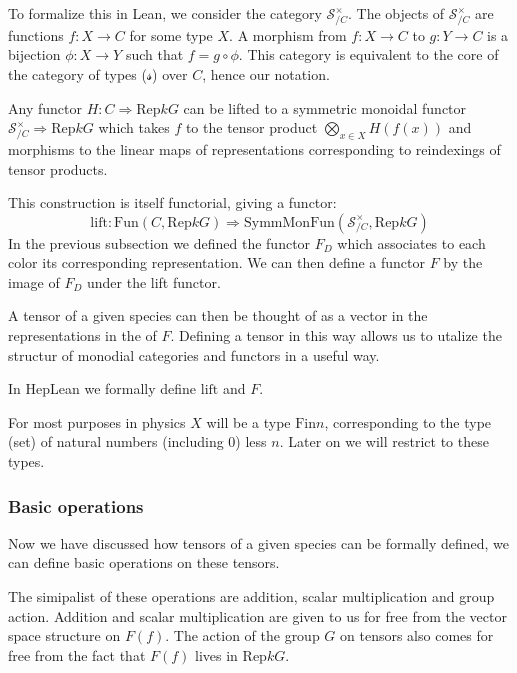 \documentclass[a4paper, 11pt]{article}
\begin{document}
To formalize this in Lean, we consider the category  $\mathcal{S}_{/C}^\times$. The objects 
of $\mathcal{S}_{/C}^\times$ are functions $f : X \to C$  for some type $X$. 
A morphism from $f : X \to C$ to $g : Y \to C$ is a bijection $\phi : X \to Y$ such that 
$f = g \circ \phi$. 
This category is equivalent to the core of the category of types ($\mathcal{s}$) over $C$, hence 
our notation. 

Any functor $H : C \Rightarrow \mathrm{Rep} k G$ can be lifted to a symmetric monoidal 
functor $\mathcal{S}_{/C}^\times \Rightarrow \mathrm{Rep} k G$ which takes $f$ to the 
tensor product $\bigotimes_{x \in X} H(f(x))$ and morphisms to the linear maps 
of representations corresponding to reindexings of
tensor products.

This construction is itself functorial, 
giving a functor: 
\begin{equation}
  \mathrm{lift} : \mathrm{Fun}(C, \mathrm{Rep} k G) \Rightarrow
  \mathrm{SymmMonFun}(\mathcal{S}_{/C}^\times, \mathrm{Rep} k G)
\end{equation} 
In the previous subsection we defined the functor $F_{D}$ which associates to each color 
its corresponding representation. We can then define a functor $F$ by the image of $F_{D}$ under
the lift functor. 

A tensor of a given species can then be thought of as a vector in the representations in the of $F$.
Defining a tensor in this way allows us to utalize the 
structur of monodial categories and functors in a useful way. 

In HepLean we formally define $\mathrm{lift}$ and $F$. 

For most purposes in physics $X$ will be a type $\mathrm{Fin} n$, corresponding to the type 
(set) of natural numbers (including 0) less $n$. Later on we will restrict to these types.

\subsubsection{Basic operations}

Now we have discussed how tensors of a given species can be formally defined, we can define 
basic operations on these tensors. 


The simipalist of these operations are addition, scalar multiplication and group action.
Addition and scalar multiplication are given to us for free from the vector space structure 
on $F(f)$. The action of the group $G$ on tensors also comes for free from the fact that 
$F(f)$ lives in $\mathrm{Rep} k G$.
\end{document}
